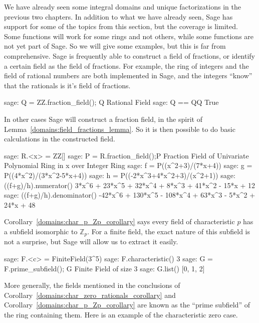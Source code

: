 We have already seen some integral domains and unique factorizations in the previous two chapters.  In addition to what we have already seen, Sage has support for some of the topics from this section, but the coverage is limited.  Some functions will work for some rings and not others, while some functions are not yet part of Sage.  So we will give some examples, but this is far from comprehensive.
%
%
Sage is frequently able to construct a field of fractions, or identify a certain field as the field of fractions.  For example, the ring of integers and the field of rational numbers are both implemented in Sage, and the integers ``know'' that the rationals is it's field of fractions.
%
\begin{sageexample}
sage: Q = ZZ.fraction_field(); Q
Rational Field
sage: Q == QQ
True
\end{sageexample}
%
In other cases Sage will construct a fraction field, in the spirit of Lemma~\ref{domains:field_fractions_lemma}.  So it is then possible to do basic calculations in the constructed field.
%
\begin{sageexample}
sage: R.<x> = ZZ[]
sage: P = R.fraction_field();P
Fraction Field of Univariate Polynomial Ring in x over Integer Ring
sage: f = P((x^2+3)/(7*x+4))
sage: g = P((4*x^2)/(3*x^2-5*x+4))
sage: h = P((-2*x^3+4*x^2+3)/(x^2+1))
sage: ((f+g)/h).numerator()
3*x^6 + 23*x^5 + 32*x^4 + 8*x^3 + 41*x^2 - 15*x + 12
sage: ((f+g)/h).denominator()
-42*x^6 + 130*x^5 - 108*x^4 + 63*x^3 - 5*x^2 + 24*x + 48
\end{sageexample}
%
%
Corollary~\ref{domains:char_p_Zp_corollary} says every field of characteristic $p$ has a subfield isomorphic to ${\mathbb Z}_p$.  For a finite field, the exact nature of this subfield is not a surprise, but Sage will allow us to extract it easily.
%
\begin{sageexample}
sage: F.<c> = FiniteField(3^5)
sage: F.characteristic()
3
sage: G = F.prime_subfield(); G
Finite Field of size 3
sage: G.list()
[0, 1, 2]
\end{sageexample}
%
More generally, the fields mentioned in the conclusions of Corollary~\ref{domains:char_zero_rationals_corollary} and Corollary~\ref{domains:char_p_Zp_corollary} are known as the ``prime subfield'' of the ring containing them.  Here is an example of the characteristic zero case.
